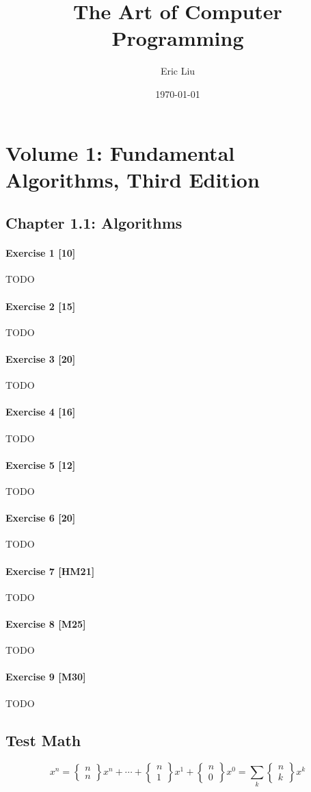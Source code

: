 \documentclass{article}
\title{The Art of Computer Programming}
\author{Eric Liu}
\date{\today}
\begin{document}
	
	\section{Volume 1: Fundamental Algorithms, Third Edition}
	
		\subsection{Chapter 1.1: Algorithms}
		
			\paragraph{Exercise 1 [10]} TODO
			\paragraph{Exercise 2 [15]} TODO
			\paragraph{Exercise 3 [20]} TODO
			\paragraph{Exercise 4 [16]} TODO
			\paragraph{Exercise 5 [12]} TODO
			\paragraph{Exercise 6 [20]} TODO
			\paragraph{Exercise 7 [HM21]} TODO
			\paragraph{Exercise 8 [M25]} TODO
			\paragraph{Exercise 9 [M30]} TODO
			
		\subsection{Test Math}
			
			$$ x^n = \begin{Bmatrix} n \\ n \end{Bmatrix} x^n + \cdots + \begin{Bmatrix} n \\ 1 \end{Bmatrix} x^1 + \begin{Bmatrix} n \\ 0 \end{Bmatrix} x^0 = \sum_k \begin{Bmatrix} n \\ k \end{Bmatrix} x^k $$
			
\end{document}
